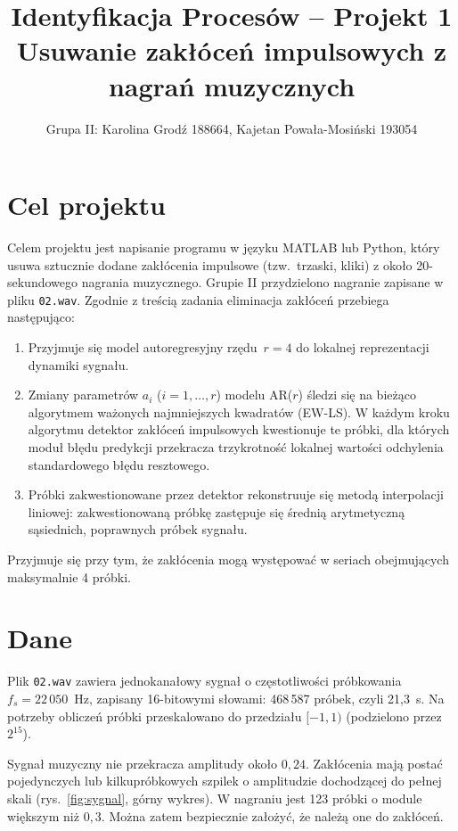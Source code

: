 \documentclass[11pt,a4paper]{article}
\title{Identyfikacja Procesów -- Projekt 1\\[0.3em]
  \large Usuwanie zakłóceń impulsowych z nagrań muzycznych}
\author{Grupa II: Karolina Grodź 188664, Kajetan Powała-Mosiński 193054}
\date{}
\begin{document}
\maketitle

\section{Cel projektu}

Celem projektu jest napisanie programu w języku MATLAB lub Python, który
usuwa sztucznie dodane zakłócenia impulsowe (tzw.\ trzaski, kliki)
z około 20-sekundowego nagrania muzycznego. Grupie II przydzielono nagranie
zapisane w pliku \texttt{02.wav}. Zgodnie z treścią zadania eliminacja
zakłóceń przebiega następująco:
\begin{enumerate}
  \item Przyjmuje się model autoregresyjny rzędu~${r = 4}$ do lokalnej
        reprezentacji dynamiki sygnału.
  \item Zmiany parametrów $a_i$ ($i = 1, \dots, r$) modelu AR($r$) śledzi
        się na bieżąco algorytmem ważonych najmniejszych kwadratów (EW-LS).
        W każdym kroku algorytmu detektor zakłóceń impulsowych kwestionuje
        te próbki, dla których moduł błędu predykcji przekracza trzykrotność
        lokalnej wartości odchylenia standardowego błędu resztowego.
  \item Próbki zakwestionowane przez detektor rekonstruuje się metodą
        interpolacji liniowej: zakwestionowaną próbkę zastępuje się średnią
        arytmetyczną sąsiednich, poprawnych próbek sygnału.
\end{enumerate}
Przyjmuje się przy tym, że zakłócenia mogą występować w seriach obejmujących
maksymalnie 4 próbki.

\section{Dane}

Plik \texttt{02.wav} zawiera jednokanałowy sygnał o częstotliwości
próbkowania $f_s = 22\,050$~Hz, zapisany 16-bitowymi słowami: 468\,587 próbek,
czyli 21,3~s. Na potrzeby obliczeń próbki przeskalowano do przedziału
$[-1, 1)$ (podzielono przez $2^{15}$).

Sygnał muzyczny nie przekracza amplitudy około $0{,}24$. Zakłócenia mają
postać pojedynczych lub kilkupróbkowych szpilek o amplitudzie dochodzącej do
pełnej skali (rys.~\ref{fig:sygnal}, górny wykres). W nagraniu jest 123
próbki o module większym niż $0{,}3$. Można zatem bezpiecznie założyć, że
należą one do zakłóceń.
\end{document}
